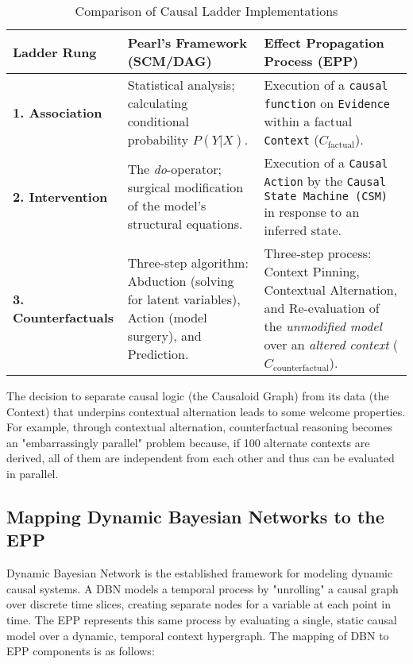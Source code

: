 \begin{table}[h!]
\centering
\caption{Comparison of Causal Ladder Implementations}
\label{tab:ladder_comparison}
\begin{tabular}{|l|p{5.5cm}|p{5.5cm}|}
\hline
\textbf{Ladder Rung} & \textbf{Pearl's Framework (SCM/DAG)} & \textbf{Effect Propagation Process (EPP)} \\
\hline
\textbf{1. Association} &
Statistical analysis; calculating conditional probability $P(Y|X)$. &
Execution of a \texttt{causal function} on \texttt{Evidence} within a factual \texttt{Context} ($C_{\text{factual}}$). \\
\hline
\textbf{2. Intervention} &
The \textit{do}-operator; surgical modification of the model's structural equations. &
Execution of a \texttt{Causal Action} by the \texttt{Causal State Machine (CSM)} in response to an inferred state. \\
\hline
\textbf{3. Counterfactuals} &
Three-step algorithm: Abduction (solving for latent variables), Action (model surgery), and Prediction. &
Three-step process: Context Pinning, Contextual Alternation, and Re-evaluation of the \textit{unmodified model} over an \textit{altered context} ($C_{\text{counterfactual}}$). \\
\hline
\end{tabular}
\end{table}

The decision to separate causal logic (the Causaloid Graph) from its data (the Context) that underpins
contextual alternation leads to some welcome properties. For example, through contextual alternation,  counterfactual reasoning becomes an "embarrassingly parallel" problem because, if 100 alternate contexts are derived, all of them are independent from each other and thus can be evaluated in parallel. 


%
%
\subsection{Mapping Dynamic Bayesian Networks to the EPP}
\label{sec:epp_Dynamic_Bayesian_Networks}

Dynamic Bayesian Network is the established framework for modeling dynamic causal systems. A DBN models a temporal process by "unrolling" a causal graph over discrete time slices, creating separate nodes for a variable at each point in time. The EPP represents this same process   by evaluating a single, static causal model over a dynamic, temporal context hypergraph. The mapping of DBN to EPP components is as follows:
 
